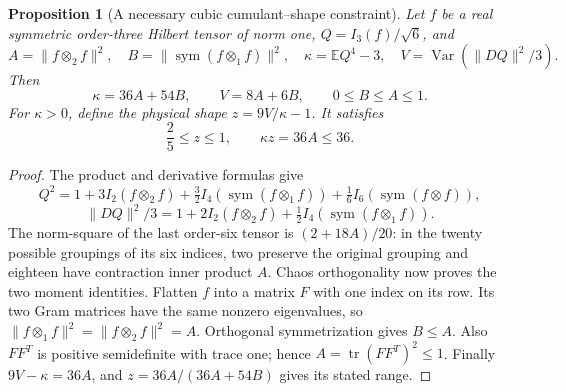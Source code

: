 \documentclass[11pt]{article}
\newtheorem{proposition}[theorem]{Proposition}
\begin{document}
\begin{proposition}[A necessary cubic cumulant--shape constraint]
\label{prop:new-cubic-shape-product}
Let $f$ be a real symmetric order-three Hilbert tensor of norm one,
$Q=I_3(f)/\sqrt6$, and
\[
 A=\|f\otimes_2f\|^2,\quad
 B=\|\operatorname{sym}(f\otimes_1f)\|^2,\quad
 \kappa=\mathbb EQ^4-3,\quad
 V=\operatorname{Var}(\|DQ\|^2/3).
\]
Then
\[
 \kappa=36A+54B,\qquad V=8A+6B,
 \qquad 0\leq B\leq A\leq1.
\]
For $\kappa>0$, define the physical shape $z=9V/\kappa-1$.
It satisfies
\begin{equation}\label{eq:new-physical-shape-product}
 \frac25\leq z\leq1,\qquad \kappa z=36A\leq36.
\end{equation}
\end{proposition}
\begin{proof}
The product and derivative formulas give
\[
 Q^2=1+3I_2(f\otimes_2f)
 +\tfrac32 I_4(\operatorname{sym}(f\otimes_1f))
 +\tfrac16 I_6(\operatorname{sym}(f\otimes f)),
\]
\[
 \|DQ\|^2/3=1+2I_2(f\otimes_2f)
                    +\tfrac12 I_4(\operatorname{sym}(f\otimes_1f)).
\]
The norm-square of the last order-six tensor is $(2+18A)/20$:
in the twenty possible groupings of its six indices, two preserve
the original grouping and eighteen have contraction inner product $A$.
Chaos orthogonality now proves the two moment identities.
Flatten $f$ into a matrix $F$ with one index on its row.  Its two
Gram matrices have the same nonzero eigenvalues, so
$\|f\otimes_1f\|^2=\|f\otimes_2f\|^2=A$.
Orthogonal symmetrization gives $B\leq A$.  Also $FF^T$ is positive
semidefinite with trace one; hence $A=\operatorname{tr}(FF^T)^2\leq1$.
Finally $9V-\kappa=36A$, and
$z=36A/(36A+54B)$ gives its stated range.
\end{proof}
\end{document}
